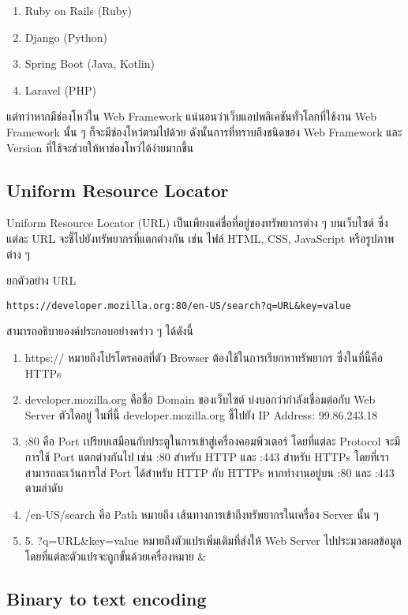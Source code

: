 \begin{enumerate}
	\item Ruby on Rails (Ruby)
	\item Django (Python)
	\item Spring Boot (Java, Kotlin)
	\item Laravel (PHP)
\end{enumerate}

แต่ทว่าหากมีช่องโหว่ใน Web Framework แน่นอนว่าเว็บแอปพลิเคชันทั่วโลกที่ใช้งาน Web Framework นั้น ๆ ก็จะมีช่องโหว่ตามไปด้วย ดังนั้นการที่ทราบถึงชนิดของ Web Framework และ Version ที่ใช้จะช่วยให้หาช่องโหว่ได้ง่ายมากขึ้น

\subsection{Uniform Resource Locator}

Uniform Resource Locator (URL) เป็นเพียงแค่ชื่อที่อยู่ของทรัพยากรต่าง ๆ บนเว็บไซต์ ซึ่งแต่ละ URL จะชี้ไปยังทรัพยากรที่แตกต่างกัน เช่น ไฟล์ HTML, CSS, JavaScript หรือรูปภาพต่าง ๆ

ยกตัวอย่าง URL

\begin{lstlisting}
https://developer.mozilla.org:80/en-US/search?q=URL&key=value
\end{lstlisting}

สามารถอธิบายองค์ประกอบอย่างคร่าว ๆ ได้ดังนี้

\begin{enumerate}
	\item https:// หมายถึงโปรโตรคอลที่ตัว Browser ต้องใช้ในการเรียกหาทรัพยากร ซึ่งในที่นี้คือ HTTPs
	\item developer.mozilla.org คือชื่อ Domain ของเว็บไซต์ บ่งบอกว่ากำลังเชื่อมต่อกับ Web Server ตัวใดอยู่ ในที่นี้ developer.mozilla.org ชี้ไปยัง IP Address: 99.86.243.18
	\item :80 คือ Port เปรียบเสมือนกับประตูในการเข้าสู่เครื่องคอมพิวเตอร์ โดยที่แต่ละ Protocol จะมีการใช้ Port แตกต่างกันไป เช่น :80 สำหรับ HTTP และ :443 สำหรับ HTTPs โดยที่เราสามารถละเว้นการใส่ Port ได้สำหรับ HTTP กับ HTTPs หากทำงานอยู่บน :80 และ :443 ตามลำดับ
	\item /en-US/search คือ Path หมายถึง เส้นทางการเข้าถึงทรัพยากรในเครื่อง Server นั้น ๆ
	\item 5.	?q=URL\&key=value หมายถึงตัวแปรเพิ่มเติมที่ส่งให้ Web Server ไปประมวลผลข้อมูล โดยที่แต่ละตัวแปรจะถูกขั้นด้วยเครื่องหมาย \&
\end{enumerate}

\subsection{Binary to text encoding}

